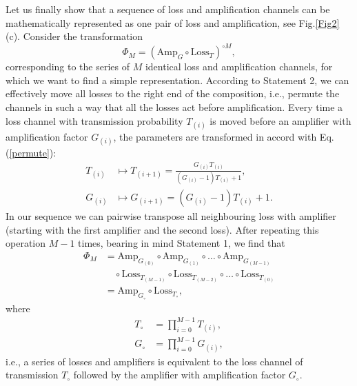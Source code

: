 \documentclass[a4paper]{article}
\renewcommand{\t}[1]{\mathrm{#1}}
\newcommand{\be}{\begin{equation}}
\newcommand{\ee}{\end{equation}}
\begin{document}
Let us finally show that a sequence of loss and amplification channels can be mathematically represented as one pair of loss and amplification, see Fig.\ref{Fig2}(c).
Consider the transformation
\be
\Phi_M = (\t{Amp}_G\circ \t{Loss}_T)^{\circ M},
\ee
corresponding to the series of $M$ identical loss and amplification channels, for which we want to find a simple representation. 
According to Statement 2, we can effectively move all losses to the right end of the composition, i.e., permute the channels in such a way that all the losses act before amplification.
Every time a loss channel with transmission probability $T_{(i)}$ is moved before an amplifier with amplification factor $G_{(i)}$, the parameters are transformed in accord with Eq.\,(\ref{permute}):
\be\begin{split}
T_{(i)} &\mapsto T_{(i+1)}=\frac{G_{(i)} T_{(i)}}{(G_{(i)}-1) T_{(i)} + 1},\\
G_{(i)} &\mapsto G_{(i+1)}=(G_{(i)}-1)T_{(i)} +1. 
\end{split}
\ee
In our sequence we can pairwise transpose all neighbouring loss with amplifier (starting with the first amplifier and the second loss).
After repeating this operation $M-1$ times, bearing in mind Statement 1, we find that
\be\begin{split}
\Phi_M&= \t{Amp}_{G_{(0)}}\circ \t{Amp}_{G_{(1)}}\circ \dots \circ\t{Amp}_{G_{(M-1)}}\\
        &\quad \circ \t{Loss}_{T_{(M-1)}}\circ \t{Loss}_{T_{(M-2)}}\circ \dots \circ \t{Loss}_{T_{(0)}}\\
        & = \t{Amp}_{G_\circ} \circ \t{Loss}_{T_\circ},
\end{split}
\ee
where 
\be
\begin{split}
    T_\circ &= \prod_{i=0}^{M-1} T_{(i)},\\
    G_\circ &= \prod_{i=0}^{M-1} G_{(i)},
\end{split}
\ee
i.e., a series of losses and amplifiers is equivalent to the loss channel of transmission $T_\circ$ followed by the amplifier with amplification factor $G_\circ$.
\end{document}
